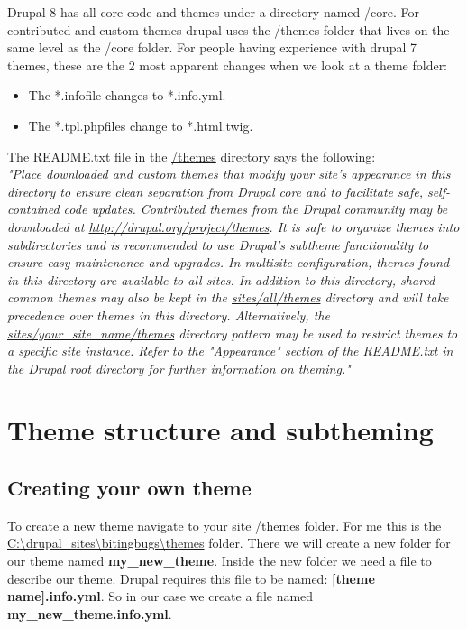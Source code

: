 Drupal 8 has all core code and themes under a directory named /core. For contributed and custom themes drupal uses the /themes folder that lives on the same level as the /core folder. For people having experience with drupal 7 themes, these are the 2 most apparent changes when we look at a theme folder:
\begin{itemize}
	\item The *.infofile changes to *.info.yml.
	\item The *.tpl.phpfiles change to *.html.twig.
\end{itemize}

The README.txt file in the \url{/themes} directory says the following:\\

\textit{"Place downloaded and custom themes that modify your site's appearance in this directory to ensure clean separation from Drupal core and to facilitate safe, self-contained code updates. Contributed themes from the Drupal community may be downloaded at \url{http://drupal.org/project/themes}.	It is safe to organize themes into subdirectories and is recommended to use	Drupal's sub­theme functionality to ensure easy maintenance and upgrades. In multisite configuration, themes found in this directory are available to all sites. In addition to this directory, shared common themes may also be kept in the \url{sites/all/themes} directory and will take precedence over themes in this directory. Alternatively, the \url{sites/your_site_name/themes} directory pattern may be used to restrict themes to a specific site instance. Refer to the "Appearance" section of the README.txt in the Drupal root directory for further information on theming."
}

\section{Theme structure and subtheming}

\subsection{Creating your own theme}

To create a new theme navigate to your site \url{/themes} folder. For me this is the \url{C:\drupal_sites\bitingbugs\themes} folder. There we will create a new folder for our theme named \textbf{my\_new\_theme}. Inside the new folder we need a file to describe our theme. Drupal requires this file to be named: \textbf{[theme name].info.yml}. So in our case we create a file named \textbf{my\_new\_theme.info.yml}.

